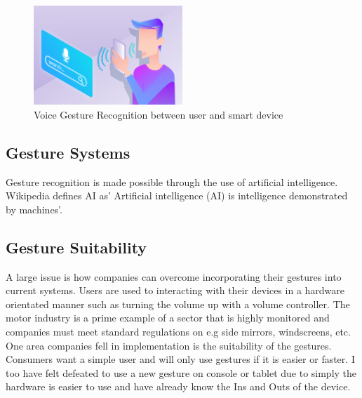 \begin{itemize}
\begin{itemize}
\end{itemize}
  \begin{figure}[h!]
  \centering
    \includegraphics[width=0.5\textwidth]{Research-Latex/images/voiceRec.jpg}
     \caption{Voice Gesture Recognition between user and smart device }
\end{figure}



\end{itemize}



  
  
  
\subsection{Gesture Systems}
Gesture recognition is made possible through the use of artificial intelligence. Wikipedia defines AI as' Artificial intelligence (AI) is intelligence demonstrated by machines'.




\subsection{Gesture  Suitability }

A large issue is how companies can overcome incorporating their gestures into current systems. Users are used to interacting with their devices in a hardware orientated manner such as turning the volume up with a volume controller. The motor industry is a prime example of a sector that is highly monitored and companies must meet standard regulations on e.g side mirrors, windscreens, etc. One area companies fell in implementation is the suitability of the gestures. Consumers want a simple user and will only use gestures if it is easier or faster. I too have felt defeated to use a new gesture on console or tablet due to simply the hardware is easier to use and have already know the Ins and Outs of the device. 


